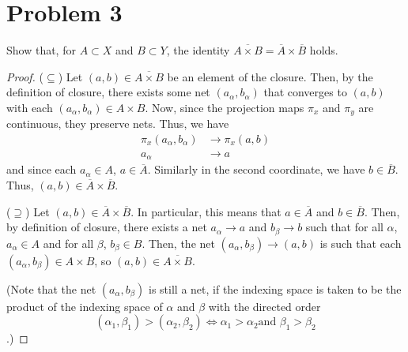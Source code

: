 \documentclass[fontsize=11pt]{scrartcl} %
\numberwithin{equation}{section} %
\numberwithin{figure}{section} %
\numberwithin{table}{section} %
\begin{document}
\section*{Problem 3}
Show that, for $A\subset X$ and $B\subset Y$, the identity $\overline{A\times B} = \overline{A}\times\overline{B}$
holds.
\\
\begin{proof}
($\subseteq$)
Let $(a,b)\in\overline{A\times B}$ be an element of the closure. Then, by the definition of
closure, there exists some net $(a_{\alpha},b_{\alpha})$ that converges to $(a,b)$ with each
$(a_{\alpha},b_{\alpha})\in A\times B$. Now, since the projection maps $\pi_x$ and $\pi_y$
are continuous, they preserve nets. Thus, we have
\[
\begin{aligned}
\pi_x(a_{\alpha},b_{\alpha})&\to\pi_x(a,b)\\
a_{\alpha}&\to a
\end{aligned}
\]
and since each $a_{\alpha}\in A$, $a\in \overline{A}$. Similarly in the second coordinate, we have
$b\in \overline{B}$. Thus, $(a,b)\in\overline{A}\times\overline{B}$.

($\supseteq$) 
Let $(a,b)\in \overline{A}\times\overline{B}$. In particular, this means that $a\in\overline{A}$ and
$b\in\overline{B}$. Then, by definition of closure, there exists a net $a_{\alpha}\to a$ and $b_{\beta}\to b$
such that for all $\alpha$, $a_{\alpha}\in A$ and for all $\beta$, $b_{\beta}\in B$.
Then, the net $(a_{\alpha},b_{\beta})\to (a,b)$ is such that each $(a_{\alpha},b_{\beta})\in A\times B$,
so $(a,b)\in\overline{A\times B}$.

(Note that the net $(a_{\alpha},b_{\beta})$ is still a net, if the indexing space is taken to be
the product of the indexing space of $\alpha$ and $\beta$ with the directed order 
\[
(\alpha_1,\beta_1) > (\alpha_2,\beta_2)\iff \alpha_1 > \alpha_2 \textrm{and } \beta_1 > \beta_2
\]
.)
\end{proof}

\end{document}
